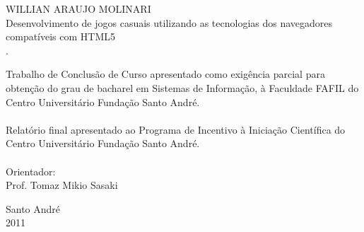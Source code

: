 \thispagestyle{empty}

\vspace{3cm}
\begin{center}
WILLIAN ARAUJO MOLINARI \\
\vspace{3cm}
\huge Desenvolvimento de jogos casuais utilizando as tecnologias dos navegadores compatíveis com HTML5 \\
\vspace{0.5cm}
\large.\\
\hspace{6cm} \begin{minipage}{0.5\textwidth}
Trabalho de Conclusão de Curso apresentado como exigência parcial para
obtenção do grau de bacharel em Sistemas de Informação, à Faculdade
FAFIL do Centro Universitário Fundação Santo André. \\
\\
Relatório final apresentado ao Programa de Incentivo à Iniciação
Científica do Centro Universitário Fundação Santo André.\\
\\
Orientador: \\
Prof. Tomaz Mikio Sasaki
\end{minipage}
\vspace{2cm}

\huge Santo André \\ 2011
\end{center}
